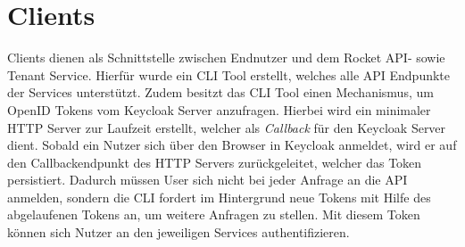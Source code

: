 \section{Clients}
\label{sec:komponenten:clients}

Clients dienen als Schnittstelle zwischen Endnutzer und dem Rocket API- sowie Tenant Service. 
Hierfür wurde ein \ac{CLI} Tool erstellt, welches alle API Endpunkte der Services
unterstützt. Zudem besitzt das CLI Tool einen Mechanismus, um OpenID Tokens vom Keycloak Server anzufragen.
Hierbei wird ein minimaler HTTP Server zur Laufzeit erstellt, welcher als \emph{Callback} für den Keycloak Server dient.
Sobald ein Nutzer sich über den Browser in Keycloak anmeldet, wird er auf den Callbackendpunkt des HTTP Servers
zurückgeleitet, welcher das Token persistiert. Dadurch müssen User sich nicht bei jeder Anfrage an die API 
anmelden, sondern die CLI fordert im Hintergrund neue Tokens mit Hilfe des abgelaufenen Tokens an,
um weitere Anfragen zu stellen.
Mit diesem Token können sich Nutzer an den jeweiligen Services authentifizieren.